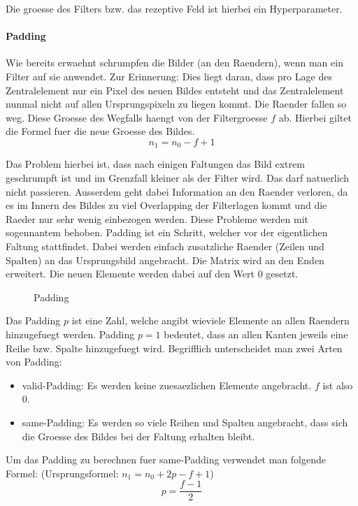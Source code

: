 \documentclass[../main]{subfiles}
\begin{document}
Die groesse des Filters bzw. das rezeptive Feld ist hierbei ein Hyperparameter.

\paragraph{Padding}
Wie bereits erwaehnt schrumpfen die Bilder (an den Raendern), wenn man ein Filter auf sie anwendet.
Zur Erinnerung: Dies liegt daran, dass pro Lage des Zentralelement nur ein Pixel
des neuen Bildes entsteht und das Zentralelement nunmal nicht auf allen
Ursprungspixeln zu liegen kommt. Die Raender fallen so weg. Diese Groesse des
Wegfalls haengt von der Filtergroesse $f$ ab. Hierbei giltet die Formel fuer die
neue Groesse des Bildes.
\begin{equation}
  n_1 = n_0 - f + 1
\end{equation}

Das Problem hierbei ist, dass nach einigen Faltungen das Bild extrem geschrumpft
ist und im Grenzfall kleiner als der Filter wird. Das darf natuerlich nicht
passieren. Ausserdem geht dabei Information an den Raender verloren, da es im
Innern des Bildes zu viel Overlapping der Filterlagen kommt und die Raeder nur
sehr wenig einbezogen werden.
\para{}
Diese Probleme werden mit sogennantem  behoben. Padding ist ein
Schritt, welcher vor der eigentlichen Faltung stattfindet. Dabei werden einfach
zusatzliche Raender (Zeilen und Spalten) an das Ursprungsbild angebracht. Die
Matrix wird an den Enden erweitert. Die neuen Elemente werden dabei auf den Wert
$0$ gesetzt.

\begin{figure}[h!]

  \caption{Padding}
\end{figure}

Das Padding $p$ ist eine Zahl, welche angibt wieviele Elemente an allen Raendern
hinzugefuegt werden. Padding $p = 1$ bedeutet, dass an allen Kanten jeweils eine
Reihe bzw. Spalte hinzugefuegt wird.
Begrifflich unterscheidet man zwei Arten von Padding:
\begin{itemize}
\item{valid-Padding: Es werden keine zuesaezlichen Elemente angebracht. $f$ ist also 0.}
\item{same-Padding: Es werden so viele Reihen und Spalten angebracht, dass
    sich die Groesse des Bildes bei der Faltung erhalten bleibt.}
\end{itemize}

Um das Padding zu berechnen fuer same-Padding verwendet man folgende Formel:
(Ursprungsformel: $n_1 = n_0 + 2p - f + 1$)
\begin{equation}
  p = \frac{f-1}{2}
\end{equation}
\end{document}
